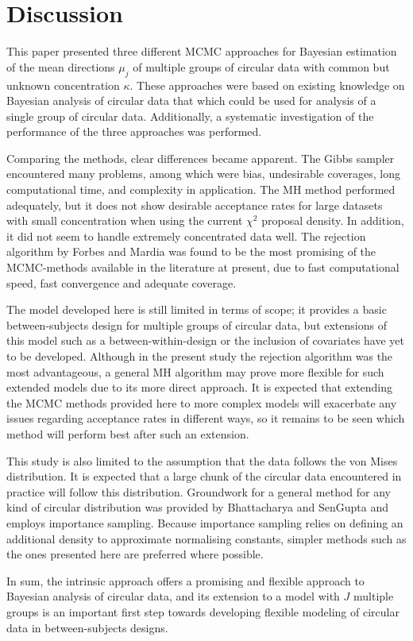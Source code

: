 \documentclass[]{gSCS2e}
\theoremstyle{plain}
\theoremstyle{definition}
\theoremstyle{remark}
\begin{document}
\section{Discussion \label{discussion}}

This paper presented three different MCMC approaches for Bayesian estimation of the mean directions $\mu_j$ of multiple groups of circular data with common but unknown concentration $\kappa$. These approaches were based on existing knowledge on Bayesian analysis of circular data that which could be used for analysis of a single group of circular data. Additionally, a systematic investigation of the performance of the three approaches was performed. 

Comparing the methods, clear differences became apparent. The Gibbs sampler encountered many problems, among which were bias, undesirable coverages, long computational time, and complexity in application. The MH method performed adequately, but it does not show desirable acceptance rates for large datasets with small concentration when using the current $\chi^2$ proposal density. In addition, it did not seem to handle extremely concentrated data well. The rejection algorithm by Forbes and Mardia \cite{forbes2014fast} was found to be the most promising of the MCMC-methods available in the literature at present, due to fast computational speed, fast convergence and adequate coverage.

The model developed here is still limited in terms of scope; it provides a basic between-subjects design for multiple groups of circular data, but extensions of this model such as a between-within-design or the inclusion of covariates have yet to be developed. Although in the present study the rejection algorithm was the most advantageous, a general MH algorithm may prove more flexible for such extended models due to its more direct approach. It is expected that extending the MCMC methods provided here to more complex models will exacerbate any issues regarding acceptance rates in different ways, so it remains to be seen which method will perform best after such an extension. 

This study is also limited to the assumption that the data follows the von Mises distribution. It is expected that a large chunk of the circular data encountered in practice will follow this distribution. Groundwork for a general method for any kind of circular distribution was provided by Bhattacharya and SenGupta \cite{Bhattacharya2009} and employs importance sampling. Because importance sampling relies on defining an additional density to approximate normalising constants, simpler methods such as the ones presented here are preferred where possible. 

In sum, the intrinsic approach offers a promising and flexible approach to Bayesian analysis of circular data, and its extension to a model with $J$ multiple groups is an important first step towards developing flexible modeling of circular data in between-subjects designs. 



\end{document}

